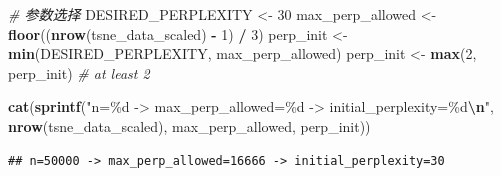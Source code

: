\documentclass[
]{article}
\newenvironment{Shaded}{\begin{snugshade}}{\end{snugshade}}
\newcommand{\CommentTok}[1]{\textcolor[rgb]{0.56,0.35,0.01}{\textit{#1}}}
\newcommand{\DecValTok}[1]{\textcolor[rgb]{0.00,0.00,0.81}{#1}}
\newcommand{\FunctionTok}[1]{\textcolor[rgb]{0.13,0.29,0.53}{\textbf{#1}}}
\newcommand{\NormalTok}[1]{#1}
\newcommand{\OtherTok}[1]{\textcolor[rgb]{0.56,0.35,0.01}{#1}}
\newcommand{\SpecialCharTok}[1]{\textcolor[rgb]{0.81,0.36,0.00}{\textbf{#1}}}
\newcommand{\StringTok}[1]{\textcolor[rgb]{0.31,0.60,0.02}{#1}}
\begin{document}
\begin{Shaded}
\begin{Highlighting}[]
\CommentTok{\# 参数选择}
\NormalTok{DESIRED\_PERPLEXITY }\OtherTok{\textless{}{-}} \DecValTok{30}
\NormalTok{max\_perp\_allowed }\OtherTok{\textless{}{-}} \FunctionTok{floor}\NormalTok{((}\FunctionTok{nrow}\NormalTok{(tsne\_data\_scaled) }\SpecialCharTok{{-}} \DecValTok{1}\NormalTok{) }\SpecialCharTok{/} \DecValTok{3}\NormalTok{)}
\NormalTok{perp\_init }\OtherTok{\textless{}{-}} \FunctionTok{min}\NormalTok{(DESIRED\_PERPLEXITY, max\_perp\_allowed)}
\NormalTok{perp\_init }\OtherTok{\textless{}{-}} \FunctionTok{max}\NormalTok{(}\DecValTok{2}\NormalTok{, perp\_init)  }\CommentTok{\# at least 2}

\FunctionTok{cat}\NormalTok{(}\FunctionTok{sprintf}\NormalTok{(}\StringTok{"n=\%d {-}\textgreater{} max\_perp\_allowed=\%d {-}\textgreater{} initial\_perplexity=\%d}\SpecialCharTok{\textbackslash{}n}\StringTok{"}\NormalTok{, }\FunctionTok{nrow}\NormalTok{(tsne\_data\_scaled), max\_perp\_allowed, perp\_init))}
\end{Highlighting}
\end{Shaded}

\begin{verbatim}
## n=50000 -> max_perp_allowed=16666 -> initial_perplexity=30
\end{verbatim}
\end{document}
